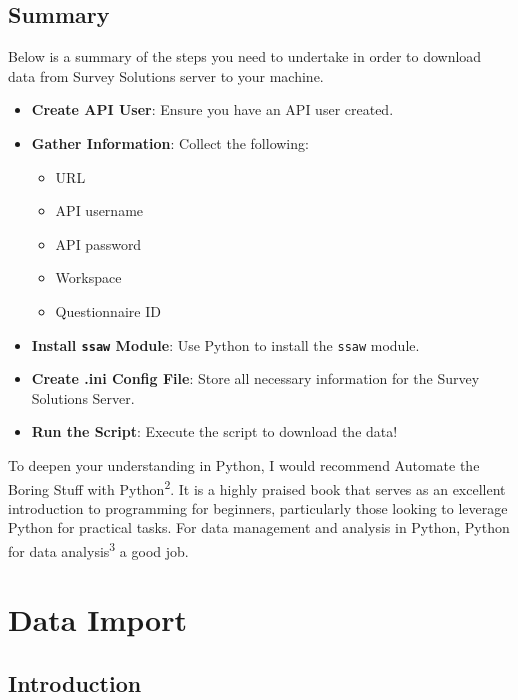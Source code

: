 \documentclass[
  letterpaper,
  DIV=11,
  numbers=noendperiod]{scrreprt}
\providecommand{\tightlist}{%
  \setlength{\itemsep}{0pt}\setlength{\parskip}{0pt}}\usepackage{longtable,booktabs,array}
\begin{document}
\section{Summary}\label{summary}

Below is a summary of the steps you need to undertake in order to
download data from Survey Solutions server to your machine.

\begin{itemize}
\tightlist
\item
  \textbf{Create API User}: Ensure you have an API user created.
\item
  \textbf{Gather Information}: Collect the following:

  \begin{itemize}
  \item
    URL
  \item
    API username
  \item
    API password
  \item
    Workspace
  \item
    Questionnaire ID
  \end{itemize}
\item
  \textbf{Install \texttt{ssaw} Module}: Use Python to install the
  \texttt{ssaw} module.
\item
  \textbf{Create .ini Config File}: Store all necessary information for
  the Survey Solutions Server.
\item
  \textbf{Run the Script}: Execute the script to download the data!
\end{itemize}

To deepen your understanding in Python, I would recommend Automate the
Boring Stuff with Python\textsuperscript{2}. It is a highly praised book
that serves as an excellent introduction to programming for beginners,
particularly those looking to leverage Python for practical tasks. For
data management and analysis in Python, Python for data
analysis\textsuperscript{3} a good job.


\chapter{Data Import}\label{data-import}

\section{Introduction}\label{introduction-2}
\end{document}
